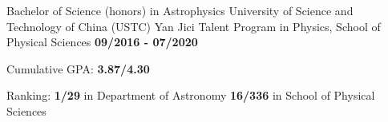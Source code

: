 
\begin{cventries}
  \cventry
    {\textnormal{Bachelor of Science (honors) in Astrophysics}} 
    {University of Science and Technology of China (USTC)\newline
    \textnormal{Yan Jici Talent Program in Physics, School of Physical Sciences}} 
    {\textcolor{awesome-emerald}{\textbf{09/2016 - 07/2020}}}
    {\textcolor{awesome-emerald}{\textbf{}}}
    {
      \begin{cvitems} %
         \item{\textnormal{Cumulative GPA:} \textbf{3.87/4.30}}
         \item{\textnormal{Ranking:} \textbf{1/29} \textnormal{in Department of Astronomy}
         \newline
         \hspace{1.3cm}\textbf{16/336} \textnormal{in School of Physical Sciences}}
      \end{cvitems}
    }
  \vspace{-0.4cm}
\end{cventries}

